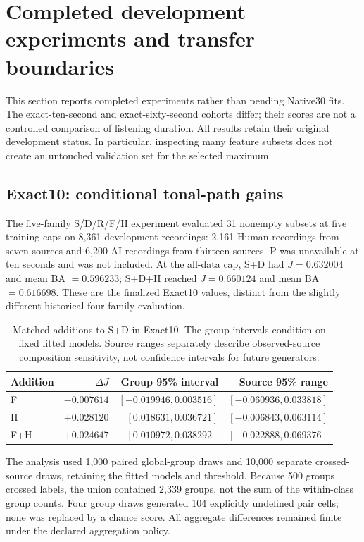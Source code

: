 \section{Completed development experiments and transfer boundaries}
\label{sec:completed-transfer-results}

This section reports completed experiments rather than pending Native30 fits.
The exact-ten-second and exact-sixty-second cohorts differ; their scores are
not a controlled comparison of listening duration. All results retain their
original development status. In particular, inspecting many feature subsets
does not create an untouched validation set for the selected maximum.

\subsection{Exact10: conditional tonal-path gains}

The five-family S/D/R/F/H experiment evaluated 31 nonempty subsets at five
training caps on 8,361 development recordings: 2,161 Human recordings from
seven sources and 6,200 AI recordings from thirteen sources. P was unavailable
at ten seconds and was not included. At the all-data cap, S+D had
$J=0.632004$ and mean BA $=0.596233$; S+D+H reached $J=0.660124$ and mean
BA $=0.616698$. These are the finalized Exact10 values, distinct from the
slightly different historical four-family evaluation.

\begin{table}[htbp]
\centering\small
\caption{Matched additions to S+D in Exact10. The group intervals condition on
fixed fitted models. Source ranges separately describe observed-source
composition sensitivity, not confidence intervals for future generators.}
\label{tab:exact10-conditional}
\begin{tabular}{lrrr}
\toprule
Addition & $\Delta J$ & Group 95\% interval & Source 95\% range\\
\midrule
F & $-0.007614$ & $[-0.019946,0.003516]$ & $[-0.060936,0.033818]$\\
H & $+0.028120$ & $[0.018631,0.036721]$ & $[-0.006843,0.063114]$\\
F+H & $+0.024647$ & $[0.010972,0.038292]$ & $[-0.022888,0.069376]$\\
\bottomrule
\end{tabular}
\end{table}

The analysis used 1,000 paired global-group draws and 10,000 separate
crossed-source draws, retaining the fitted models and threshold. Because 500
groups crossed labels, the union contained 2,339 groups, not the sum of the
within-class group counts. Four group draws generated 104 explicitly undefined
pair cells; none was replaced by a chance score. All aggregate differences
remained finite under the declared aggregation policy.

